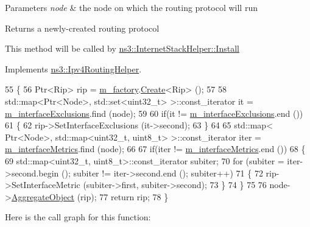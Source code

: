 \begin{DoxyParams}{Parameters}
{\em node} & the node on which the routing protocol will run \\
\hline
\end{DoxyParams}
\begin{DoxyReturn}{Returns}
a newly-\/created routing protocol
\end{DoxyReturn}
This method will be called by \hyperlink{classns3_1_1InternetStackHelper_a6645b412f31283d2d9bc3d8a95cebbc0}{ns3\+::\+Internet\+Stack\+Helper\+::\+Install} 

Implements \hyperlink{classns3_1_1Ipv4RoutingHelper_aa00350f9ab9f2ea2ff83f6ef04dae209}{ns3\+::\+Ipv4\+Routing\+Helper}.


\begin{DoxyCode}
55 \{
56   Ptr<Rip> rip = \hyperlink{classns3_1_1RipHelper_ae6737890612fb5a8469ff9a911512190}{m\_factory}.\hyperlink{classns3_1_1ObjectFactory_a18152e93f0a6fe184ed7300cb31e9896}{Create}<Rip> ();
57 
58   std::map<Ptr<Node>, std::set<uint32\_t> >::const\_iterator it = 
      \hyperlink{classns3_1_1RipHelper_a7615bc949f0c5d908b75d5af40a40e12}{m\_interfaceExclusions}.find (node);
59 
60   \textcolor{keywordflow}{if}(it != \hyperlink{classns3_1_1RipHelper_a7615bc949f0c5d908b75d5af40a40e12}{m\_interfaceExclusions}.end ())
61     \{
62       rip->SetInterfaceExclusions (it->second);
63     \}
64 
65   std::map< Ptr<Node>, std::map<uint32\_t, uint8\_t> >::const\_iterator iter = 
      \hyperlink{classns3_1_1RipHelper_a61fdf6837031cb851e1e85b6f7feab61}{m\_interfaceMetrics}.find (node);
66 
67   \textcolor{keywordflow}{if}(iter != \hyperlink{classns3_1_1RipHelper_a61fdf6837031cb851e1e85b6f7feab61}{m\_interfaceMetrics}.end ())
68     \{
69       std::map<uint32\_t, uint8\_t>::const\_iterator subiter;
70       \textcolor{keywordflow}{for} (subiter = iter->second.begin (); subiter != iter->second.end (); subiter++)
71         \{
72           rip->SetInterfaceMetric (subiter->first, subiter->second);
73         \}
74     \}
75 
76   node->\hyperlink{classns3_1_1Object_a79dd435d300f3deca814553f561a2922}{AggregateObject} (rip);
77   \textcolor{keywordflow}{return} rip;
78 \}
\end{DoxyCode}


Here is the call graph for this function\+:


